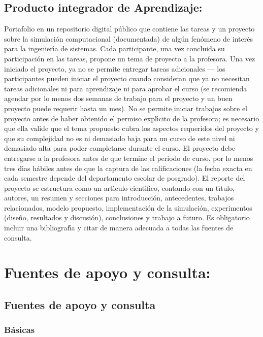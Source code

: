 \documentclass[10 pt]{article}
\begin{document}
\subsection{Producto integrador de Aprendizaje:} Portafolio en un
repositorio digital p\'{u}blico que contiene las tareas y un proyecto
sobre la simulaci\'{o}n computacional (documentada) de alg\'{u}n fen\'{o}meno de
inter\'{e}s para la ingenier\'{\i}a de sistemas. Cada participante, una vez
concluida su participaci\'{o}n en las tareas, propone un tema de proyecto
a la profesora. Una vez iniciado el proyecto, ya no se permite
entregar tareas adicionales --- los participantes pueden iniciar el
proyecto cuando consideran que ya no necesitan tareas adicionales ni
para aprendizaje ni para aprobar el curso (se recomienda agendar por
lo menos dos semanas de trabajo para el proyecto y un buen proyecto
puede requerir hasta un mes). No se permite iniciar trabajos sobre el
proyecto antes de haber obtenido el permiso expl\'{\i}cito de la profesora;
es necesario que ella valide que el tema propuesto cubra los aspectos
requeridos del proyecto y que su complejidad no es ni demasiado baja
para un curso de este nivel ni demasiado alta para poder completarse
durante el curso.  El proyecto debe entregarse a la profesora antes de
que termine el periodo de curso, por lo menos tres d\'{\i}as h\'{a}biles antes
de que la captura de las calificaciones (la fecha exacta en cada
semestre depende del departamento escolar de posgrado). El reporte del
proyecto se estructura como un art\'{\i}culo cient\'{\i}fico, contando
con un t\'{\i}tulo, autores, un resumen y secciones para
introducci\'{o}n, antecedentes, trabajos relacionados, modelo
propuesto, implementaci\'{o}n de la simulaci\'{o}n, experimentos
(dise\~{n}o, resultados y discusi\'{o}n), conclusiones y trabajo a
futuro. Es obligatorio incluir una bibliograf\'{\i}a y citar de manera
adecuada a todas las fuentes de consulta.

\section{Fuentes de apoyo y consulta:}
\subsection{Fuentes de apoyo y consulta}
\subsubsection{B\'{a}sicas}
\end{document}
